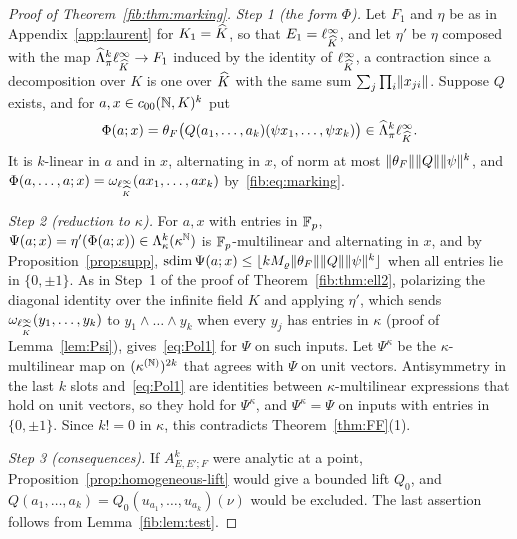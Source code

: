 \begin{proof}[Proof of Theorem~\ref{fib:thm:marking}]
\emph{Step 1 (the form $\Phi$).} Let $F_1$ and $\eta$ be as in Appendix~\ref{app:laurent} for $K_1=\widehat K$, so that
$E_1=\ell^\infty_{\widehat K}$, and let $\eta'$ be $\eta$ composed with the map $\widehat\Lambda^k_\pi\ell^\infty_{\widehat K}\to F_1$ induced by
the identity of $\ell^\infty_{\widehat K}$, a contraction since a decomposition over $K$ is one over $\widehat K$ with the same sum
$\sum_j\prod_i\lVert x_{ji}\rVert$. Suppose $Q$ exists, and for $a,x\in c_{00}(\mathbb N,K)^k$ put
\[
 \Phi(a;x)=\theta_F\bigl(Q(a_1,\dots,a_k)(\psi x_1,\dots,\psi x_k)\bigr)\in\widehat\Lambda^k_\pi\ell^\infty_{\widehat K}.
\]
It is $k$\nobreakdash-linear in $a$ and in $x$, alternating in $x$, of norm at most $\lVert \theta_F\rVert\lVert Q\rVert\lVert \psi\rVert^k$,
and $\Phi(a,\dots,a;x)=\omega_{\ell^\infty_{\widehat K}}(ax_1,\dots,ax_k)$ by~\eqref{fib:eq:marking}.

\emph{Step 2 (reduction to $\kappa$).} For $a,x$ with entries in $\mathbb F_p$, $\Psi(a;x)=\eta'(\Phi(a;x))\in
\Lambda^k_\kappa(\kappa^\mathbb N)$ is $\mathbb F_p$\nobreakdash-multilinear and alternating in $x$, and by Proposition~\ref{prop:supp},
$\operatorname{sdim}\Psi(a;x)\le\lfloor kM_\varrho\lVert \theta_F\rVert\lVert Q\rVert\lVert \psi\rVert^k\rfloor$ when all entries lie in $\{0,\pm1\}$. As in
Step~1 of the proof of Theorem~\ref{fib:thm:ell2}, polarizing the diagonal identity over the infinite field $K$ and
applying $\eta'$, which sends $\omega_{\ell^\infty_{\widehat K}}(y_1,\dots,y_k)$ to $y_1\wedge\dots\wedge y_k$ when every $y_j$ has
entries in $\kappa$ (proof of Lemma~\ref{lem:Psi}), gives~\eqref{eq:Pol1} for $\Psi$ on such inputs. Let $\Psi^\kappa$ be
the $\kappa$\nobreakdash-multilinear map on $(\kappa^{(\mathbb N)})^{2k}$ that agrees with $\Psi$ on unit vectors. Antisymmetry in
the last $k$ slots and~\eqref{eq:Pol1} are identities between $\kappa$\nobreakdash-multilinear expressions that hold on
unit vectors, so they hold for $\Psi^\kappa$, and $\Psi^\kappa=\Psi$ on inputs with entries in $\{0,\pm1\}$. Since $k!=0$
in $\kappa$, this contradicts Theorem~\ref{thm:FF}(1).

\emph{Step 3 (consequences).} If $A^k_{E,E';F}$ were analytic at a point, Proposition~\ref{prop:homogeneous-lift} would
give a bounded lift $Q_0$, and $Q(a_1,\dots,a_k)=Q_0(u_{a_1},\dots,u_{a_k})(\nu)$ would be excluded. The last assertion
follows from Lemma~\ref{fib:lem:test}.
\end{proof}


